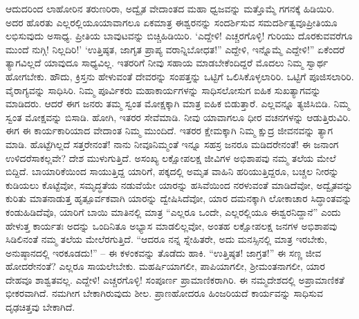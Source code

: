 ಆದುದರಿಂದ ಲಾಹೋರಿನ ತರುಣರಿರಾ, ಅದ್ವೈತ ವೇದಾಂತದ ಮಹಾ ಧ್ವಜವನ್ನು ಮತ್ತೊಮ್ಮೆ ಗಗನಕ್ಕೆ ಹಿಡಿಯಿರಿ. ಅದರ ಹೊರತು ಎಲ್ಲರಲ್ಲಿಯೂ\break ಯಾವಾಗಲೂ ಏಕಮಾತ್ರ ಈಶ್ವರನನ್ನು ಸಂದರ್ಶಿಸುವ ಸಮದರ್ಶಿತ್ವವೂ\break ಪ್ರೀತಿಯೂ ಲಭಿಸುವುದು ಅಸಾಧ್ಯ. ಪ್ರೀತಿಯ ಬಾವುಟವನ್ನು ಬಿಚ್ಚಿಹಿಡಿಯಿರಿ. ‘ಎದ್ದೇಳಿ! ಎಚ್ಚರಗೊಳ್ಳಿ! ಗುರಿಯು ದೊರಕುವವರೆಗೂ ಮುಂದೆ ನುಗ್ಗಿ! ನಿಲ್ಲದಿರಿ!’ ‘ಉತ್ತಿಷ್ಠತ, ಜಾಗೃತ ಪ್ರಾಪ್ಯ ವರಾನ್ನಿಬೋಧತ!” ಎದ್ದೇಳಿ, ಇನ್ನೊಮ್ಮೆ ಎದ್ದೇಳಿ!” ಏಕೆಂದರೆ ತ್ಯಾಗವಿಲ್ಲದೆ ಯಾವುದೂ ಸಾಧ್ಯವಿಲ್ಲ. ಇತರರಿಗೆ ನೀವು ಸಹಾಯ ಮಾಡಬೇಕೆಂದಿದ್ದರೆ ಮೊದಲು ನಿಮ್ಮ ಸ್ವಾರ್ಥ ಹೋಗಬೇಕು. ಹೌದು, ಕ್ರಿಸ್ತನು ಹೇಳುವಂತೆ ದೇವರನ್ನು ಸಂಪತ್ತನ್ನು ಒಟ್ಟಿಗೆ ಒಲಿಸಿಕೊಳ್ಳಲಾರಿರಿ. ಒಟ್ಟಿಗೆ ಪೂಜಿಸಲಾರಿರಿ. ವೈರಾಗ್ಯವನ್ನು ಸಾಧಿಸಿರಿ. ನಿಮ್ಮ ಪೂರ್ವಿಕರು ಮಹಾಕಾರ್ಯಗಳನ್ನು ಸಾಧಿಸಲೋಸುಗ ಐಹಿಕ ಸುಖತ್ಯಾಗವನ್ನು ಮಾಡಿದರು. ಆದರೆ ಈಗ ಜನರು ತಮ್ಮ ಸ್ವಂತ ಮೋಕ್ಷಕ್ಕಾಗಿ ಮಾತ್ರ ಐಹಿಕ ಬಿಡುತ್ತಾರೆ. ಎಲ್ಲವನ್ನೂ ತ್ಯಜಿಸಿಬಿಡಿ. ನಿಮ್ಮ ಸ್ವಂತ ಮೋಕ್ಷವನ್ನು ಬಿಸಾಡಿ. ಹೋಗಿ, ಇತರರ ಸೇವೆಮಾಡಿ. ನೀವು ಯಾವಾಗಲೂ ಧೀರ ವಚನಗಳನ್ನು ಆಡುತ್ತಿರುವಿರಿ. ಈಗ ಈ ಕಾರ್ಯಕಾರಿಯಾದ ವೇದಾಂತ ನಿಮ್ಮ ಮುಂದಿದೆ. ಇತರರ ಕ್ಷೇಮಕ್ಕಾಗಿ ನಿಮ್ಮ ಕ್ಷುದ್ರ ಜೀವನವನ್ನು ತ್ಯಾಗ ಮಾಡಿ. ಹೊಟ್ಟೆಗಿಲ್ಲದೆ ಸತ್ತರೇನಂತೆ! ನಾನು ನೀವೂ\break ನಿಮ್ಮಂತೆ ಇನ್ನೂ ಸಹಸ್ರ ಜನರೂ ಮಡಿದರೇನಂತೆ! ಈ ಜನಾಂಗ ಉಳಿದರೆ\break ಸಾಕಲ್ಲವೇ? ದೇಶ ಮುಳುಗುತ್ತಿದೆ. ಅಸಂಖ್ಯ ಲಕ್ಷೋಪಲಕ್ಷ ಜೀವಿಗಳ ಅಭಿಶಾಪವು ನಮ್ಮ ತಲೆಯ ಮೇಲೆ ಬಿದ್ದಿದೆ. ಬಾಯಾರಿಕೆಯಿಂದ ಸಾಯುತ್ತಿದ್ದ ಯಾರಿಗೆ, ಪಕ್ಕದಲ್ಲಿ ಅಮೃತ ವಾಹಿನಿ ಹರಿಯುತ್ತಿದ್ದರೂ, ಬಚ್ಚಲ ನೀರನ್ನು ಕುಡಿಯಲು ಕೊಟ್ಟೆವೋ, ಸಮೃದ್ಧತೆಯ ನಡುವೆಯೇ ಯಾರನ್ನು ಹಸಿವೆಯಿಂದ ನರಳುವಂತೆ ಮಾಡಿದೆವೋ, ಅದ್ವೈತವನ್ನು ಕುರಿತು ಮಾತನಾಡುತ್ತ ಹೃತ್ಪೂರ್ವಕವಾಗಿ ಯಾರನ್ನು ದ್ವೇಷಿಸಿದೆವೋ, ಯಾರ ದಮನಕ್ಕಾಗಿ ಲೋಕಾಚಾರ ಸಿದ್ಧಾಂತವನ್ನು ಕಂಡುಹಿಡಿದೆವೊ, ಯಾರಿಗೆ ಬಾಯಿ ಮಾತಿನಲ್ಲಿ ಮಾತ್ರ “ಎಲ್ಲರೂ ಒಂದೇ, ಎಲ್ಲರಲ್ಲಿಯೂ ಈಶ್ವರನಿದ್ದಾನೆ” ಎಂದು ಹೇಳುತ್ತ ಕಾರ್ಯತಃ ಅದನ್ನು ಒಂದಿನಿತೂ ಅಭ್ಯಾಸ ಮಾಡಲಿಲ್ಲವೋ, ಅಂತಹ ಲಕ್ಷೋಪಲಕ್ಷ ಜನಗಳ ಅಭಿಶಾಪವು ಸಿಡಿಲಿನಂತೆ ನಮ್ಮ ತಲೆಯ ಮೇಲೆರಗುತ್ತಿದೆ. “ಆದರೂ ನನ್ನ ಸ್ನೇಹಿತರೇ, ಅದು ಮನಸ್ಸಿನಲ್ಲಿ ಮಾತ್ರ ಇರಬೇಕು, ಅನುಷ್ಠಾನದಲ್ಲಿ ಇರಕೂಡದು!” – ಈ ಕಳಂಕವನ್ನು ತೊಡೆದು ಹಾಕಿ. “ಉತ್ತಿಷ್ಠತ! ಜಾಗ್ರತ!” ಈ ಸಣ್ಣ ಜೀವ ಹೋದರೇನಂತೆ? ಎಲ್ಲರೂ ಸಾಯಲೇಬೇಕು. ಮಹರ್ಷಿಯಾಗಲೀ, ಪಾಪಿಯಾಗಲೀ, ಶ‍್ರೀಮಂತನಾಗಲೀ, ಯಾರ ದೇಹವೂ ಶಾಶ್ವತವಲ್ಲ. ಎದ್ದೇಳಿ! ಎಚ್ಚರಗೊಳ್ಳಿ! ಸಂಪೂರ್ಣ ಪ್ರಾಮಾಣಿಕರಾಗಿರಿ. ಈ ನಮ್ಮ\break ದೇಶದಲ್ಲಿ ಅಪ್ರಾಮಾಣಿಕತೆ ಭೀಕರವಾಗಿದೆ. ನಮಗೀಗ ಬೇಕಾಗಿರುವುದು ಶೀಲ. ಪ್ರಾಣಹೋದರೂ ಹಿಂಜರಿಯದೆ ಕಾರ್ಯವನ್ನು ಸಾಧಿಸುವ ದೃಢಚಿತ್ತವು ಬೇಕಾಗಿದೆ.

